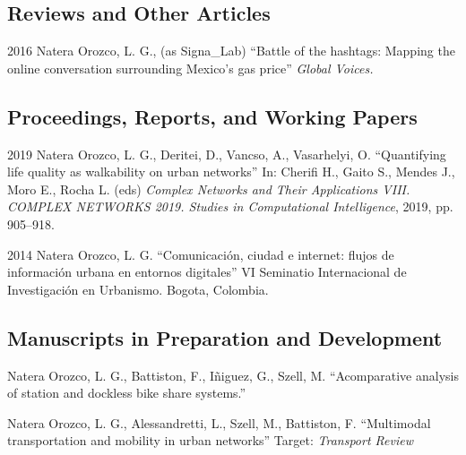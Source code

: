 \documentclass{academiccv}
\begin{document}
\subsection*{Reviews and Other Articles}
\begin{tablist}
	\item[2016] \tab Natera Orozco, L. G., (as Signa\_Lab) \enquote{Battle of the hashtags: Mapping the online conversation surrounding Mexico's gas price} \textit{Global Voices.}
\end{tablist}


\subsection*{Proceedings, Reports, and Working Papers}
\begin{tablist}
	\item[2019] \tab Natera Orozco, L. G., Deritei, D., Vancso, A., Vasarhelyi, O. \enquote{Quantifying life quality as walkability on urban networks} In: Cherifi H., Gaito S., Mendes J., Moro E., Rocha L. (eds) \textit{Complex Networks and Their Applications VIII. COMPLEX NETWORKS 2019. Studies in Computational Intelligence}, 2019, pp. 905–918.
	\item[2014] \tab Natera Orozco, L. G. \enquote{Comunicación, ciudad e internet: flujos de información urbana en entornos digitales} VI Seminatio Internacional de Investigación en Urbanismo. Bogota, Colombia.
\end{tablist}

\subsection*{Manuscripts in Preparation and Development}
\begin{tablist}
	\item[\the\year] Natera Orozco, L. G., Battiston, F., I\~niguez, G., Szell, M. \enquote{Acomparative analysis of station and dockless bike share systems.} 
	\item[\the\year] Natera Orozco, L. G., Alessandretti, L., Szell, M., Battiston, F. \enquote{Multimodal transportation and mobility in urban networks} Target: \textit{Transport Review}
\end{tablist}
\end{document}
